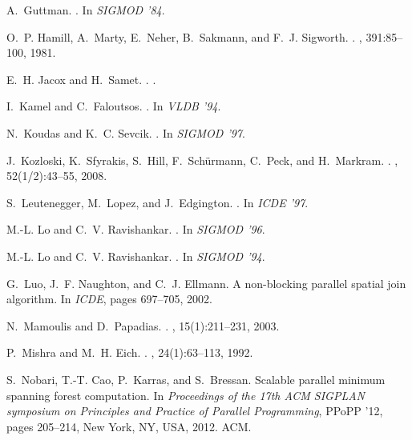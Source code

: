 \documentclass{sig-alternate}
\begin{document}
\begin{thebibliography}{10}
A.~Guttman.
.
\newblock In {\em SIGMOD '84}.

O.~P. Hamill, A.~Marty, E.~Neher, B.~Sakmann, and F.~J. Sigworth.
.
, 391:85--100,
  1981.

E.~H. Jacox and H.~Samet.
.
.

I.~Kamel and C.~Faloutsos.
.
\newblock In {\em VLDB '94}.

N.~Koudas and K.~C. Sevcik.
.
\newblock In {\em SIGMOD '97}.

J.~Kozloski, K.~Sfyrakis, S.~Hill, F.~Sch\"urmann, C.~Peck, and H.~Markram.
.
,
  52(1/2):43--55, 2008.

S.~Leutenegger, M.~Lopez, and J.~Edgington.
.
\newblock In {\em ICDE '97}.

M.-L. Lo and C.~V. Ravishankar.
.
\newblock In {\em SIGMOD '96}.

M.-L. Lo and C.~V. Ravishankar.
.
\newblock In {\em SIGMOD '94}.

G.~Luo, J.~F. Naughton, and C.~J. Ellmann.
\newblock A non-blocking parallel spatial join algorithm.
\newblock In {\em ICDE}, pages 697--705, 2002.

N.~Mamoulis and D.~Papadias.
.
, 15(1):211--231, 2003.

P.~Mishra and M.~H. Eich.
.
, 24(1):63--113, 1992.

S.~Nobari, T.-T. Cao, P.~Karras, and S.~Bressan.
\newblock Scalable parallel minimum spanning forest computation.
\newblock In {\em Proceedings of the 17th ACM SIGPLAN symposium on Principles
  and Practice of Parallel Programming}, PPoPP '12, pages 205--214, New York,
  NY, USA, 2012. ACM.


\end{thebibliography}
\end{document}
